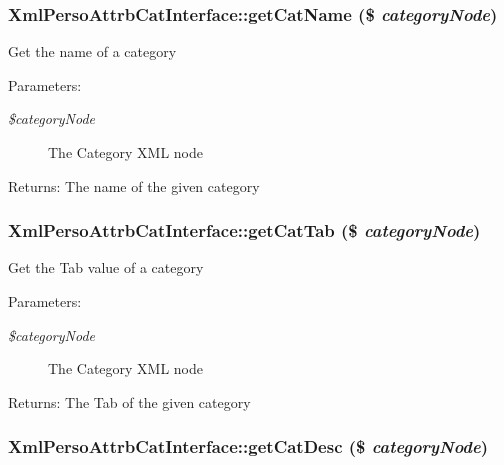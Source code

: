 \subsubsection{\setlength{\rightskip}{0pt plus 5cm}Xml\-Perso\-Attrb\-Cat\-Interface::get\-Cat\-Name (\$ {\em category\-Node})}\label{classXmlPersoAttrbCatInterface_dc26dd60948b98fed10f25970bb8d7a0}


Get the name of a category

\begin{Desc}
\item[Parameters:]
\begin{description}
\item[{\em \$category\-Node}]The Category XML node\end{description}
\end{Desc}
\begin{Desc}
\item[Returns:]The name of the given category \end{Desc}
\subsubsection{\setlength{\rightskip}{0pt plus 5cm}Xml\-Perso\-Attrb\-Cat\-Interface::get\-Cat\-Tab (\$ {\em category\-Node})}\label{classXmlPersoAttrbCatInterface_ebde1c21a80b0ee7a50e04b96771d007}


Get the Tab value of a category

\begin{Desc}
\item[Parameters:]
\begin{description}
\item[{\em \$category\-Node}]The Category XML node\end{description}
\end{Desc}
\begin{Desc}
\item[Returns:]The Tab of the given category \end{Desc}
\subsubsection{\setlength{\rightskip}{0pt plus 5cm}Xml\-Perso\-Attrb\-Cat\-Interface::get\-Cat\-Desc (\$ {\em category\-Node})}\label{classXmlPersoAttrbCatInterface_a44eab3656a443d89ac748b05b2447e3}


